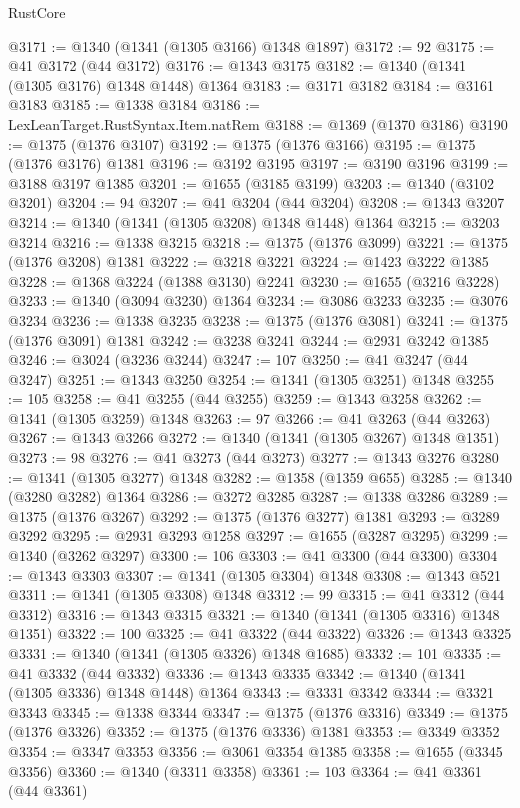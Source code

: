 \begin{lexlean}{RustCore}
\begin{coremodule}
@3171 := @1340 (@1341 (@1305 @3166) @1348 @1897)
@3172 := 92
@3175 := @41 @3172 (@44 @3172)
@3176 := @1343 @3175
@3182 := @1340 (@1341 (@1305 @3176) @1348 @1448) @1364
@3183 := @3171 @3182
@3184 := @3161 @3183
@3185 := @1338 @3184
@3186 := LexLeanTarget.RustSyntax.Item.natRem
@3188 := @1369 (@1370 @3186)
@3190 := @1375 (@1376 @3107)
@3192 := @1375 (@1376 @3166)
@3195 := @1375 (@1376 @3176) @1381
@3196 := @3192 @3195
@3197 := @3190 @3196
@3199 := @3188 @3197 @1385
@3201 := @1655 (@3185 @3199)
@3203 := @1340 (@3102 @3201)
@3204 := 94
@3207 := @41 @3204 (@44 @3204)
@3208 := @1343 @3207
@3214 := @1340 (@1341 (@1305 @3208) @1348 @1448) @1364
@3215 := @3203 @3214
@3216 := @1338 @3215
@3218 := @1375 (@1376 @3099)
@3221 := @1375 (@1376 @3208) @1381
@3222 := @3218 @3221
@3224 := @1423 @3222 @1385
@3228 := @1368 @3224 (@1388 @3130) @2241
@3230 := @1655 (@3216 @3228)
@3233 := @1340 (@3094 @3230) @1364
@3234 := @3086 @3233
@3235 := @3076 @3234
@3236 := @1338 @3235
@3238 := @1375 (@1376 @3081)
@3241 := @1375 (@1376 @3091) @1381
@3242 := @3238 @3241
@3244 := @2931 @3242 @1385
@3246 := @3024 (@3236 @3244)
@3247 := 107
@3250 := @41 @3247 (@44 @3247)
@3251 := @1343 @3250
@3254 := @1341 (@1305 @3251) @1348
@3255 := 105
@3258 := @41 @3255 (@44 @3255)
@3259 := @1343 @3258
@3262 := @1341 (@1305 @3259) @1348
@3263 := 97
@3266 := @41 @3263 (@44 @3263)
@3267 := @1343 @3266
@3272 := @1340 (@1341 (@1305 @3267) @1348 @1351)
@3273 := 98
@3276 := @41 @3273 (@44 @3273)
@3277 := @1343 @3276
@3280 := @1341 (@1305 @3277) @1348
@3282 := @1358 (@1359 @655)
@3285 := @1340 (@3280 @3282) @1364
@3286 := @3272 @3285
@3287 := @1338 @3286
@3289 := @1375 (@1376 @3267)
@3292 := @1375 (@1376 @3277) @1381
@3293 := @3289 @3292
@3295 := @2931 @3293 @1258
@3297 := @1655 (@3287 @3295)
@3299 := @1340 (@3262 @3297)
@3300 := 106
@3303 := @41 @3300 (@44 @3300)
@3304 := @1343 @3303
@3307 := @1341 (@1305 @3304) @1348
@3308 := @1343 @521
@3311 := @1341 (@1305 @3308) @1348
@3312 := 99
@3315 := @41 @3312 (@44 @3312)
@3316 := @1343 @3315
@3321 := @1340 (@1341 (@1305 @3316) @1348 @1351)
@3322 := 100
@3325 := @41 @3322 (@44 @3322)
@3326 := @1343 @3325
@3331 := @1340 (@1341 (@1305 @3326) @1348 @1685)
@3332 := 101
@3335 := @41 @3332 (@44 @3332)
@3336 := @1343 @3335
@3342 := @1340 (@1341 (@1305 @3336) @1348 @1448) @1364
@3343 := @3331 @3342
@3344 := @3321 @3343
@3345 := @1338 @3344
@3347 := @1375 (@1376 @3316)
@3349 := @1375 (@1376 @3326)
@3352 := @1375 (@1376 @3336) @1381
@3353 := @3349 @3352
@3354 := @3347 @3353
@3356 := @3061 @3354 @1385
@3358 := @1655 (@3345 @3356)
@3360 := @1340 (@3311 @3358)
@3361 := 103
@3364 := @41 @3361 (@44 @3361)

\end{coremodule}
\end{lexlean}

